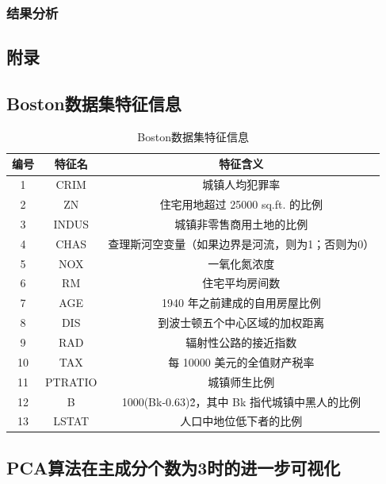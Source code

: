\documentclass[12pt,a4paper]{article}
\theoremstyle{definition}
\begin{document}
\subsubsection{结果分析}
\newpage
\begin{appendix}
	\section{附录}
	\subsection{Boston数据集特征信息}
	\label{apd:boston_char}
	\begin{table}[H]
		\renewcommand\arraystretch{1.35}
		\caption{Boston数据集特征信息}
		\label{tab:boston_char}
		\centering
		
		\begin{tabular}{c|c|c}
			\centering
			编号 & 特征名 & 特征含义 \\
			\hline
			1 & CRIM & 城镇人均犯罪率 \\
			2 & ZN & 住宅用地超过 25000 sq.ft. 的比例 \\
			3 & INDUS & 城镇非零售商用土地的比例 \\
			4 & CHAS & 查理斯河空变量（如果边界是河流，则为1；否则为0） \\
			5 & NOX & 一氧化氮浓度 \\
			6 & RM & 住宅平均房间数 \\
			7 & AGE & 1940 年之前建成的自用房屋比例 \\
			8 & DIS & 到波士顿五个中心区域的加权距离 \\
			9 & RAD & 辐射性公路的接近指数 \\
			10 & TAX & 每 10000 美元的全值财产税率 \\
			11 & PTRATIO & 城镇师生比例 \\
			12 & B & 1000(Bk-0.63)\^ 2，其中 Bk 指代城镇中黑人的比例 \\
			13 & LSTAT & 人口中地位低下者的比例 \\			
		\end{tabular}
	\end{table}
	
	\subsection{PCA算法在主成分个数为3时的进一步可视化}
	\label{apd:vis3}
	

\end{appendix}
\end{document}
